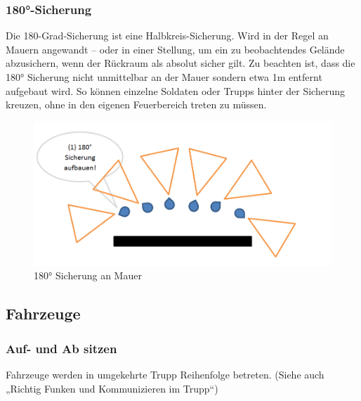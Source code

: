 \subsubsection{180°-Sicherung}
Die 180-Grad-Sicherung ist eine Halbkreis-Sicherung. Wird in der Regel an Mauern angewandt – oder in einer Stellung, um ein zu beobachtendes Gelände abzusichern, wenn der Rückraum als absolut sicher gilt. Zu beachten ist, dass die 180° Sicherung nicht unmittelbar an der Mauer sondern etwa 1m entfernt aufgebaut wird. So können einzelne Soldaten oder Trupps hinter der Sicherung kreuzen, ohne in den eigenen Feuerbereich treten zu müssen. \\
\begin{figure}[htbp]
	\centering
	\includegraphics[width=15cm]{./Grafiken/Abschnitt/180er.png}
	\caption{180° Sicherung an Mauer}
\end{figure}
\subsection{Fahrzeuge}
\subsubsection{Auf- und Ab sitzen}
Fahrzeuge werden in umgekehrte Trupp Reihenfolge betreten. (Siehe auch „Richtig Funken und Kommunizieren im Trupp“) \\
